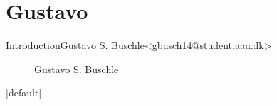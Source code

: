 \section{Gustavo}

\begin{frame}{Introduction}{Gustavo S. Buschle\newline<gbusch14@student.aau.dk>}
	\begin{figure}[h!]
		\caption{Gustavo S. Buschle}
		\centering    		
	\end{figure}
\end{frame}
[default]

%
%
%
